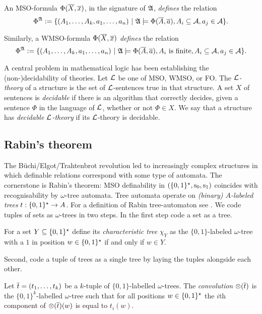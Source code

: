 An MSO-formula $\Phi(\mbox{$\overline {X}$},\mbox{$\overline {x}$})$, in the signature of $\mathfrak{A}$,
{\em defines} the relation 
\[
\Phi^{\mathfrak{A}} := \{(A_1,\dots,A_k,a_1,\dots,a_n) \ \vert \  \mathfrak{A} \models \Phi(\mbox{$\overline {A}$},\mbox{$\overline {a}$}), A_i \subseteq {\mathcal A}, a_j \in {\mathcal A} \}.
\]

Similarly, a WMSO-formula $\Phi(\mbox{$\overline {X}$},\mbox{$\overline {x}$})$ {\em defines} the relation 
\[
\Phi^{\mathfrak{A}} := \{(A_1,\dots,A_k,a_1,\dots,a_n) \ \vert \  \mathfrak{A} \models \Phi(\mbox{$\overline {A}$},\mbox{$\overline {a}$}), A_i \textrm{ is finite}, A_i \subseteq {\mathcal A}, a_j \in {\mathcal A} \}.
\]

A central problem in mathematical logic has been establishing  the (non-)decidability
of theories.
Let ${\mathcal L}$ be one of MSO, WMSO, or FO. The {\em ${\mathcal L}$-theory} of a structure is the set
of ${\mathcal L}$-sentences true in that structure.  A set $X$ of sentences is {\em
decidable} if there is an algorithm that correctly decides, given a sentence
$\Phi$ in the language of ${\mathcal L}$, whether or not $\Phi \in X$.  We say that a
structure has {\em decidable ${\mathcal L}$-theory} if its ${\mathcal L}$-theory is decidable.  

\subsection{Rabin's theorem}

The B\"uchi/Elgot/Trahtenbrot revolution led to increasingly complex
structures in which definable relations correspond with some type of automata. 
The cornerstone is Rabin's theorem: MSO definability in $\mbox{$(\{0,1\}^{\star},\mathrm{s}_0, \mathrm{s}_1)$}$ coincides with recognisability by $\omega$-tree automata.
Tree automata operate on {\em (binary) $A$-labeled trees} $t:\{0,1\}^\star  \to A$. 
For a definition of Rabin tree-automaton see \cite{Thom90}. 
We code tuples of sets as $\omega$-trees in two steps. 
In the first step code a set as a tree.

\begin{definition} \label{AS:dfn:chartree}
For a set $Y \subseteq \{0,1\}^\star$ define
its {\em characteristic tree} $\chi_Y$ as the $\{0,1\}$-labeled $\omega$-tree with a $1$ in position $w \in \{0,1\}^\star$ if and only if $w \in Y$.
\end{definition}

Second, code a tuple of trees as a single tree by laying the tuples alongside each other.

\begin{definition} \label{AS:dfn:convtrees}
Let $\mbox{$\overline {t}$} = (t_1,\dots,t_k)$
be a $k$-tuple of $\{0,1\}$-labelled $\omega$-trees. 
The {\em convolution} $\otimes(\mbox{$\overline {t}$})$ is the $\{0,1\}^k$-labelled $\omega$-tree such that for all positions $w \in \{0,1\}^\star$
the $i$th component of $\otimes(\mbox{$\overline {t}$})(w)$ is equal to $t_i(w)$.
\end{definition} 

